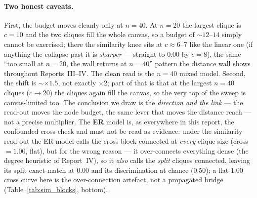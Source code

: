 \documentclass[11pt,a4paper]{article}
\begin{document}
\paragraph{Two honest caveats.} First, the budget moves cleanly only at $n=40$. At $n=20$ the
largest clique is $c=10$ and the two cliques fill the whole canvas, so a budget of $\sim12$--$14$
simply cannot be exercised; there the similarity knee sits at $c\approx6$--$7$ like the linear one
(if anything the collapse past it is \emph{sharper} --- straight to $0.00$ by $c=8$), the same
``too small at $n=20$, the wall returns at $n=40$'' pattern the distance wall shows throughout
Reports~III--IV. The clean read is the $n=40$ mixed model. Second, the shift is $\sim\times1.5$, not
exactly $\times2$; part of that is that at the largest $n=40$ cliques ($c\to20$) the cliques again
fill the canvas, so the very top of the sweep is canvas-limited too. The conclusion we draw is the
\emph{direction and the link} --- the read-out moves the node budget, the same lever that moves the
distance reach --- not a precise multiplier. The \textbf{ER} model is, as everywhere in this report,
the confounded cross-check and must not be read as evidence: under the similarity read-out the ER
model calls the cross block connected at \emph{every} clique size (cross $=1.00$, flat), but for the
wrong reason --- it over-connects everything dense (the degree heuristic of Report~IV), so it
\emph{also} calls the \emph{split} cliques connected, leaving its split exact-match at $0.00$ and its
discrimination at chance ($0.50$); a flat-$1.00$ cross curve here is the over-connection artefact, not
a propagated bridge (Table~\ref{tab:sim_blocks}, bottom).
\end{document}
